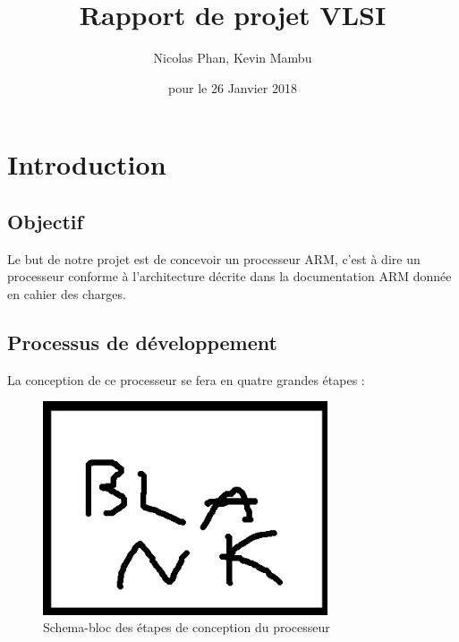\documentclass{article}
\title{Rapport de projet VLSI}
\author{Nicolas Phan, Kevin Mambu}
\date{pour le 26 Janvier 2018}
\begin{document}
\pagestyle{headings}
\maketitle
\tableofcontents
\newpage

\section{Introduction}

\subsection{Objectif}

Le but de notre projet est de concevoir un processeur ARM, c'est à dire un processeur conforme
à l'architecture décrite dans la documentation ARM donnée en cahier des charges.

\subsection{Processus de développement}

La conception de ce processeur se fera en quatre grandes étapes :

\begin{figure}[ht]
\includegraphics[width=0.75\textwidth]{pics/blank.png}
\centering
\caption{Schema-bloc des étapes de conception du processeur} 
\end{figure}
\end{document}
